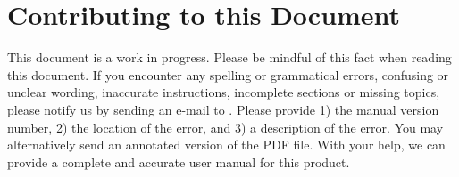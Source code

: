 %
%

\chapter*{Contributing to this Document}

This document is a work in progress.  Please be mindful of this fact when reading this document.  If you encounter any spelling or grammatical errors, confusing or unclear wording, inaccurate instructions, incomplete sections or missing topics, please notify us by sending an e-mail to .  Please provide 1) the manual version number, 2) the location of the error, and 3) a description of the error.  You may alternatively send an annotated version of the PDF file.  With your help, we can provide a complete and accurate user manual for this product.
